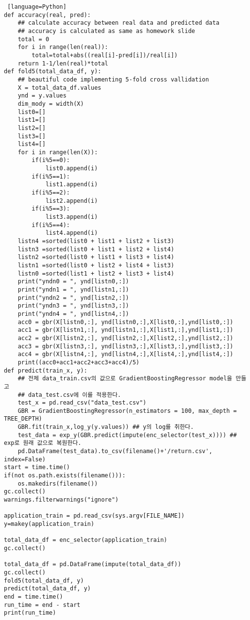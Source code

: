 \documentclass{article}
\begin{document}
\begin{lstlisting} [language=Python]
def accuracy(real, pred):
    ## calculate accuracy between real data and predicted data
    ## accuracy is calculated as same as homework slide
    total = 0
    for i in range(len(real)):
        total=total+abs((real[i]-pred[i])/real[i])
    return 1-1/len(real)*total
def fold5(total_data_df, y):
    ## beautiful code implementing 5-fold cross vallidation
    X = total_data_df.values
    ynd = y.values
    dim_mody = width(X)
    list0=[]
    list1=[]
    list2=[]
    list3=[]
    list4=[]
    for i in range(len(X)):
        if(i%5==0):
            list0.append(i)
        if(i%5==1):
            list1.append(i)
        if(i%5==2):
            list2.append(i)
        if(i%5==3):
            list3.append(i)
        if(i%5==4):
            list4.append(i)
    listn4 =sorted(list0 + list1 + list2 + list3)
    listn3 =sorted(list0 + list1 + list2 + list4)
    listn2 =sorted(list0 + list1 + list3 + list4)
    listn1 =sorted(list0 + list2 + list4 + list3)
    listn0 =sorted(list1 + list2 + list3 + list4)
    print("yndn0 = ", ynd[listn0,:])
    print("yndn1 = ", ynd[listn1,:])
    print("yndn2 = ", ynd[listn2,:])
    print("yndn3 = ", ynd[listn3,:])
    print("yndn4 = ", ynd[listn4,:])
    acc0 = gbr(X[listn0,:], ynd[listn0,:],X[list0,:],ynd[list0,:])
    acc1 = gbr(X[listn1,:], ynd[listn1,:],X[list1,:],ynd[list1,:])
    acc2 = gbr(X[listn2,:], ynd[listn2,:],X[list2,:],ynd[list2,:])
    acc3 = gbr(X[listn3,:], ynd[listn3,:],X[list3,:],ynd[list3,:])
    acc4 = gbr(X[listn4,:], ynd[listn4,:],X[list4,:],ynd[list4,:])
    print((acc0+acc1+acc2+acc3+acc4)/5)
def predict(train_x, y):
    ## 전체 data_train.csv의 값으로 GradientBoostingRegressor model을 만들고
    ## data_test.csv에 이를 적용한다.
    test_x = pd.read_csv("data_test.csv")
    GBR = GradientBoostingRegressor(n_estimators = 100, max_depth = TREE_DEPTH)
    GBR.fit(train_x,log_y(y.values)) ## y의 log를 취한다.
    test_data = exp_y(GBR.predict(impute(enc_selector(test_x)))) ## exp로 원래 값으로 복원한다.
    pd.DataFrame(test_data).to_csv(filename()+'/return.csv', index=False)
start = time.time()
if(not os.path.exists(filename())):
    os.makedirs(filename())
gc.collect()        
warnings.filterwarnings("ignore")

application_train = pd.read_csv(sys.argv[FILE_NAME])
y=makey(application_train)

total_data_df = enc_selector(application_train)
gc.collect()

total_data_df = pd.DataFrame(impute(total_data_df))
gc.collect()
fold5(total_data_df, y)
predict(total_data_df, y)
end = time.time()
run_time = end - start
print(run_time)
\end{lstlisting}
\end{document}
